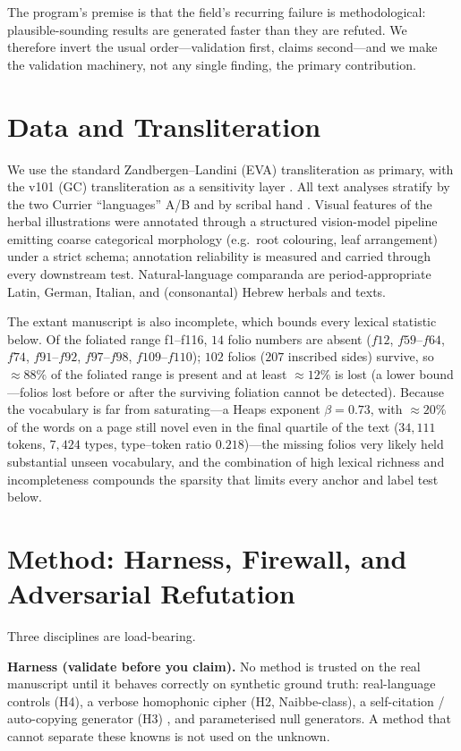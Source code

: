 \documentclass[11pt]{article}
\begin{document}
The program's premise is that the field's recurring failure is methodological:
plausible-sounding results are generated faster than they are refuted. We therefore
invert the usual order---validation first, claims second---and we make the validation
machinery, not any single finding, the primary contribution.

\section{Data and Transliteration}
We use the standard Zandbergen--Landini (EVA) transliteration as primary, with the
v101 (GC) transliteration as a sensitivity layer \citep{zandbergen_voynichnu}. All
text analyses stratify by the two Currier ``languages'' A/B \citep{currier1976} and by
scribal hand \citep{fagindavis2020hands}. Visual features of the herbal illustrations
were annotated through a structured vision-model pipeline emitting coarse categorical
morphology (e.g.\ root colouring, leaf arrangement) under a strict schema; annotation
reliability is measured and carried through every downstream test. Natural-language
comparanda are period-appropriate Latin, German, Italian, and (consonantal) Hebrew
herbals and texts.

The extant manuscript is also incomplete, which bounds every lexical statistic below.
Of the foliated range f1--f116, $14$ folio numbers are absent ($f12$, $f59$--$f64$,
$f74$, $f91$--$f92$, $f97$--$f98$, $f109$--$f110$); $102$ folios ($207$ inscribed
sides) survive, so $\approx\!88\%$ of the foliated range is present and at least
$\approx\!12\%$ is lost (a lower bound---folios lost before or after the surviving
foliation cannot be detected). Because the vocabulary is far from saturating---a Heaps
exponent $\beta=0.73$, with $\approx\!20\%$ of the words on a page still novel even in
the final quartile of the text ($34{,}111$ tokens, $7{,}424$ types, type--token ratio
$0.218$)---the missing folios very likely held substantial unseen vocabulary, and the
combination of high lexical richness and incompleteness compounds the sparsity that
limits every anchor and label test below.

\section{Method: Harness, Firewall, and Adversarial Refutation}
Three disciplines are load-bearing.

\textbf{Harness (validate before you claim).} No method is trusted on the real
manuscript until it behaves correctly on synthetic ground truth: real-language
controls (H4), a verbose homophonic cipher (H2, Naibbe-class), a self-citation /
auto-copying generator (H3) \citep{timm2020selfcitation}, and parameterised null
generators. A method that cannot separate these knowns is not used on the unknown.
\end{document}
